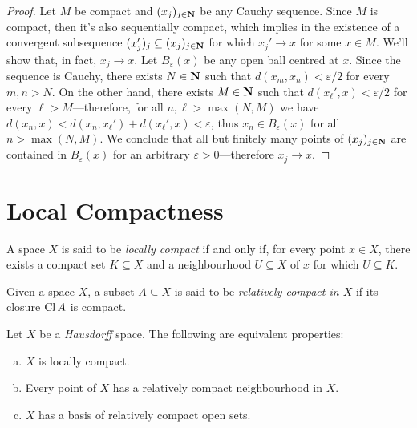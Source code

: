 \begin{proof}
Let \(M\) be compact and \((x_j)_{j \in \mathbf{N}}\) be any Cauchy sequence. Since
\(M\) is compact, then it's also sequentially compact, which implies in the
existence of a convergent subsequence \((x_j')_j \subseteq (x_j)_{j \in \mathbf{N}}\)
for which \(x_j' \to x\) for some \(x \in M\). We'll show that, in fact,
\(x_j \to x\). Let \(B_{\varepsilon}(x)\) be any open ball centred at
\(x\). Since the sequence is Cauchy, there exists \(N \in \mathbf{N}\) such that
\(d(x_m, x_n) < \varepsilon/2\) for every \(m, n > N\). On the other hand, there
exists \(M \in \mathbf{N}\) such that \(d(x_{\ell}', x) < \varepsilon/2\) for every
\(\ell > M\)---therefore, for all \(n, \ell > \max(N, M)\) we have
\(d(x_n, x) < d(x_n, x_{\ell}') + d(x_{\ell}', x) < \varepsilon\), thus
\(x_n \in B_{\varepsilon}(x)\) for all \(n > \max(N, M)\). We conclude that all
but finitely many points of \((x_j)_{j \in \mathbf{N}}\) are contained in
\(B_{\varepsilon}(x)\) for an arbitrary \(\varepsilon > 0\)---therefore
\(x_j \to x\).
\end{proof}

\section{Local Compactness}

\begin{definition}
\label{def:locally-compact}
A space \(X\) is said to be \emph{locally compact} if and only if, for every
point \(x \in X\), there exists a compact set \(K \subseteq X\) and a
neighbourhood \(U \subseteq X\) of \(x\) for which \(U \subseteq K\).
\end{definition}

\begin{definition}
\label{def:relatively-compact}
Given a space \(X\), a subset \(A \subseteq X\) is said to be \emph{relatively
  compact in \(X\)} if its closure \(\operatorname{Cl} A\) is compact.
\end{definition}

\begin{proposition}
\label{prop:hausdorff-locally-and-relatively-compact}
Let \(X\) be a \emph{Hausdorff} space. The following are equivalent properties:
\begin{enumerate}[(a)]\setlength\itemsep{0em}
\item \(X\) is locally compact.
\item Every point of \(X\) has a relatively compact neighbourhood in \(X\).
\item \(X\) has a basis of relatively compact open sets.
\end{enumerate}
\end{proposition}

